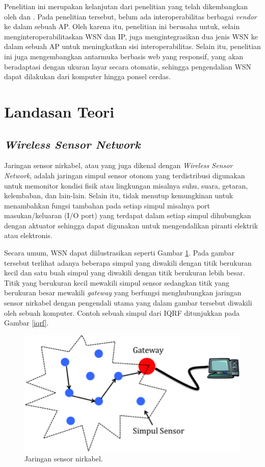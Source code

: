   Penelitian ini merupakan kelanjutan dari penelitian yang telah dikembangkan oleh \cite{widyawan2012ihome} dan \cite{wibowo2013wireless}. Pada penelitian tersebut, belum ada interoperabilitas berbagai \emph{vendor} ke dalam sebuah AP. Oleh karena itu, penelitian ini berusaha untuk, selain menginteroperabilitaskan WSN dan IP, juga mengintegrasikan dua jenis WSN ke dalam sebuah AP untuk meningkatkan sisi interoperabilitas. Selain itu, penelitian ini juga mengembangkan antarmuka berbasis web yang responsif, yang akan beradaptasi dengan ukuran layar secara otomatis, sehingga pengendalian WSN dapat dilakukan dari komputer hingga ponsel cerdas.

\section{Landasan Teori}
  \subsection{\emph{Wireless Sensor Network}}
    Jaringan sensor nirkabel, atau yang juga dikenal dengan \emph{Wireless Sensor Network}, adalah jaringan simpul sensor otonom yang terdistribusi digunakan untuk memonitor kondisi fisik atau lingkungan misalnya suhu, suara, getaran, kelembaban, dan lain-lain. Selain itu, tidak menutup kemungkinan untuk menambahkan fungsi tambahan pada setiap simpul misalnya port masukan/keluaran (I/O port) yang terdapat dalam setiap simpul dihubungkan dengan aktuator sehingga dapat digunakan untuk mengendalikan piranti elektrik atau elektronis.

    Secara umum, WSN dapat diilustrasikan seperti Gambar \ref{wsn}. Pada gambar tersebut terlihat adanya beberapa simpul yang diwakili dengan titik berukuran kecil dan satu buah simpul yang diwakili dengan titik berukuran lebih besar. Titik yang berukuran kecil mewakili simpul sensor sedangkan titik yang berukuran besar mewakili \emph{gateway} yang berfungsi menghubungkan jaringan sensor nirkabel dengan pengendali utama yang dalam gambar tersebut diwakili oleh sebuah komputer. Contoh sebuah simpul dari IQRF ditunjukkan pada Gambar \ref{iqrf}.

      \begin{figure}[H]
        \centering
          \includegraphics{gambar/wsn}
          \caption{Jaringan sensor nirkabel.}
          \label{wsn}
      \end{figure}

